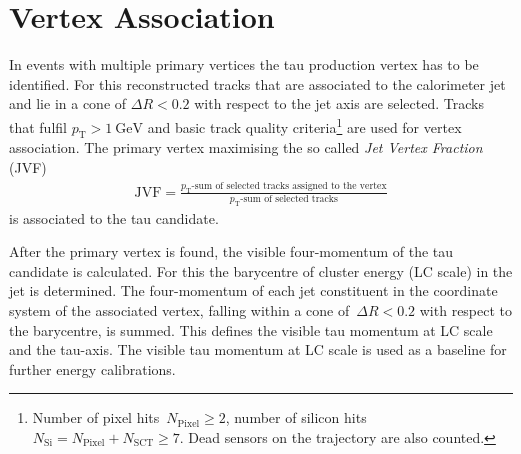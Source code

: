 \section{Vertex Association}
\label{sec:reco_vertex_assoc}
%
%
In events with multiple primary vertices the tau production vertex has to be
identified. For this reconstructed tracks that are associated to the calorimeter
jet
and lie in a cone of $\Delta R < 0.2$ with respect to the jet axis are selected.
Tracks that fulfil $p_\text{T} > \SI{1}{\GeV}$ and basic track quality
criteria\footnote{Number of pixel hits~$N_\text{Pixel} \geq 2$, number of
  silicon hits~$N_\text{Si} = N_\text{Pixel} + N_\text{SCT} \geq 7$. Dead
  sensors on the trajectory are also counted.} are used for vertex association.
The primary vertex maximising the so called \emph{Jet Vertex Fraction} (JVF)
\begin{align*}
  \text{JVF} = \frac{p_\text{T}\text{-sum of selected tracks assigned to the vertex}}{p_\text{T}\text{-sum of selected tracks}}
\end{align*}
is associated to the tau candidate.

After the primary vertex is found, the visible four-momentum of the tau
candidate is calculated.
For this the barycentre of cluster energy (LC scale) in the jet is determined.
The four-momentum of each jet constituent in the coordinate system of the
associated vertex, falling within a cone of~$\Delta R < 0.2$ with respect to the
barycentre, is summed. This defines the visible tau momentum at LC scale and the
tau-axis. The visible tau momentum at LC scale is used as a baseline for further
energy calibrations.

